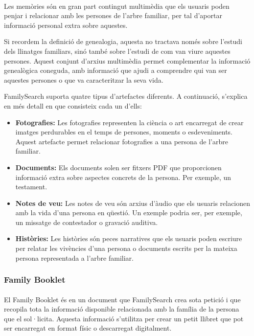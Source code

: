     \paragraph{}
    Les memòries són en gran part contingut multimèdia que els usuaris poden penjar i relacionar amb les persones de l'arbre familiar, per tal d'aportar informació personal extra sobre aquestes.

    Si recordem la definició de genealogia, aquesta no tractava només sobre l'estudi dels llinatges familiars, sinó també sobre l'estudi de com van viure aquestes persones. Aquest conjunt d'arxius multimèdia permet complementar la informació genealògica coneguda, amb informació que ajudi a comprendre qui van ser aquestes persones o que va caracteritzar la seva vida.

    FamilySearch suporta quatre tipus d'artefactes diferents. A continuació, s'explica en més detall en que consisteix cada un d'ells:

    \begin{itemize}
        \item \textbf{Fotografies:} Les fotografies representen la ciència o art encarregat de crear imatges perdurables en el temps de persones, moments o esdeveniments. Aquest artefacte permet relacionar fotografies a una persona de l'arbre familiar.
        \item \textbf{Documents:} Els documents solen ser fitxers PDF que proporcionen informació extra sobre aspectes concrets de la persona. Per exemple, un testament.
        \item \textbf{Notes de veu:} Les notes de veu són arxius d’àudio que els usuaris relacionen amb la vida d’una persona en qüestió. Un exemple podria ser, per exemple, un missatge de contestador o gravació auditiva.
        \item \textbf{Històries:} Les històries són peces narratives que els usuaris poden escriure per relatar les vivències d'una persona o documents escrits per la mateixa persona representada a l'arbre familiar.
    \end{itemize}


    \subsubsection{Family Booklet}

    \paragraph{}
    El Family Booklet és en un document que FamilySearch crea sota petició i que recopila tota la informació disponible relacionada amb la família de la persona que el sol·licita. Aquesta informació s'utilitza per crear un petit llibret que pot ser encarregat en format físic o descarregat digitalment.

